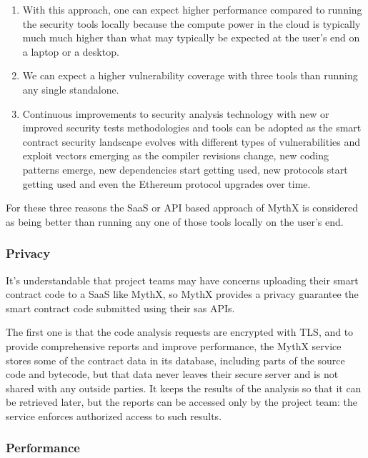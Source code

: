 \begin{enumerate}
\def\labelenumi{\arabic{enumi}.}
\tightlist
\item
  With this approach, one can expect higher performance compared to
  running the security tools locally because the compute power in the
  cloud is typically much much higher than what may typically be
  expected at the user's end on a laptop or a desktop.
\item
  We can expect a higher vulnerability coverage with three tools than
  running any single standalone.
\item
  Continuous improvements to security analysis technology with new or
  improved security tests methodologies and tools can be adopted as the
  smart contract security landscape evolves with different types of
  vulnerabilities and exploit vectors emerging as the compiler revisions
  change, new coding patterns emerge, new dependencies start getting
  used, new protocols start getting used and even the Ethereum protocol
  upgrades over time.
\end{enumerate}

For these three reasons the SaaS or API based approach of MythX is
considered as being better than running any one of those tools locally
on the user's end.

\subsubsection{Privacy}\label{privacy}

It's understandable that project teams may have concerns uploading their
smart contract code to a SaaS like MythX, so MythX provides a privacy
guarantee the smart contract code submitted using their sas APIs.

The first one is that the code analysis requests are encrypted with TLS,
and to provide comprehensive reports and improve performance, the MythX
service stores some of the contract data in its database, including
parts of the source code and bytecode, but that data never leaves their
secure server and is not shared with any outside parties. It keeps the
results of the analysis so that it can be retrieved later, but the
reports can be accessed only by the project team: the service enforces
authorized access to such results.

\subsubsection{Performance}\label{performance}


